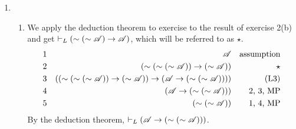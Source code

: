 \begin{enumerate}
\begin{enumerate}[label=(\alph*), align=left]
      \item
        
      \item {}
    \end{enumerate}

  \item %
    \begin{enumerate}[label=(\alph*), align=left]
      \item We apply the deduction theorem to exercise to the result of exercise 2(b) and get \(\vdash_{L} (\sim(\sim\mathscr{A}) \rightarrow \mathscr{A})\), which will be referred to as \(\star\).
        \begin{align*}
          \text{1}&&
          \mathscr{A}&&
          \text{assumption}\\
          \text{2}&&
          (\sim(\sim(\sim\mathscr{A})) \rightarrow (\sim\mathscr{A}))&&
          \star\\
          \text{3}&&
          ((\sim(\sim(\sim\mathscr{A})) \rightarrow (\sim\mathscr{A})) \rightarrow (\mathscr{A} \rightarrow (\sim(\sim\mathscr{A}))))&&
          \text{(L3)}\\
          \text{4}&&
          (\mathscr{A} \rightarrow (\sim(\sim\mathscr{A})))&&
          \text{2, 3, MP}\\
          \text{5}&&
          (\sim(\sim\mathscr{A}))&&
          \text{1, 4, MP}
        \end{align*}
      By the deduction theorem, \(\vdash_{L} (\mathscr{A} \rightarrow (\sim(\sim\mathscr{A})))\).


\end{enumerate}
\end{enumerate}
